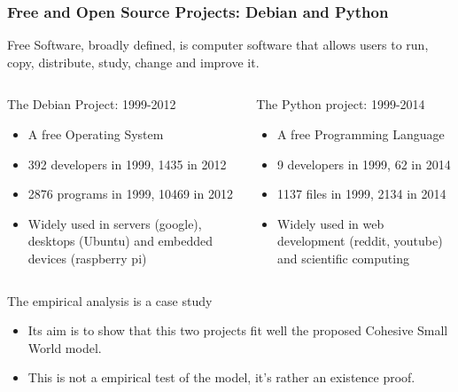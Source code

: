\documentclass[ignorenonframetext,red,8pt,notes=hide]{beamer}
\begin{document}
\begin{frame}
\frametitle{Free and Open Source Projects: Debian and Python}

Free Software, broadly defined, is computer software that allows users to run, copy, distribute, study, change and improve it.

\begin{columns}[c]
\begin{column}{0.5\textwidth}
\begin{block}{The Debian Project: 1999-2012}
\begin{itemize}
\item A free Operating System
\item 392 developers in 1999, 1435 in 2012 
\item 2876 programs in 1999, 10469 in 2012
\item Widely used in servers (google), desktops (Ubuntu) and embedded devices (raspberry pi)
\end{itemize}
\end{block}
\end{column}

\begin{column}{0.5\textwidth}
\begin{block}{The Python project: 1999-2014}
\begin{itemize}
\item A free Programming Language
\item 9 developers in 1999, 62 in 2014
\item 1137 files in 1999, 2134 in 2014 
\item Widely used in web development (reddit, youtube) and scientific computing
\end{itemize}
\end{block}
\end{column}
\end{columns}

\pause

\begin{block}{The empirical analysis is a case study}
\begin{itemize}
\item Its aim is to show that this two projects fit well the proposed Cohesive Small World model.
\item This is not a empirical test of the model, it's rather an existence proof. 
\end{itemize}
\end{block}

\end{frame}
\end{document}
